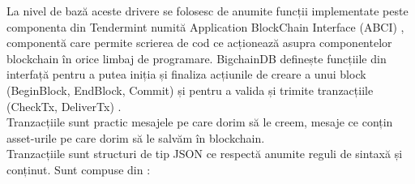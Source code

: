 La nivel de bază aceste drivere se folosesc de anumite funcții implementate peste componenta din Tendermint numită Application BlockChain Interface (ABCI) \cite{Tendermint_WhatIs}, componentă care permite scrierea de cod ce acționează asupra componentelor blockchain în orice limbaj de programare. BigchainDB definește funcțiile din interfață pentru a putea iniția și finaliza acțiunile de creare a unui block (BeginBlock, EndBlock, Commit) și pentru a valida și trimite tranzacțiile (CheckTx, DeliverTx) \cite{BigchainDB_Art}.\\

Tranzacțiile sunt practic mesajele pe care dorim să le creem, mesaje ce conțin asset-urile pe care dorim să le salvăm în blockchain. \\

Tranzacțiile sunt structuri de tip JSON ce respectă anumite reguli de sintaxă și conținut. Sunt compuse din \cite{BigchainDB_ReadMe}:
